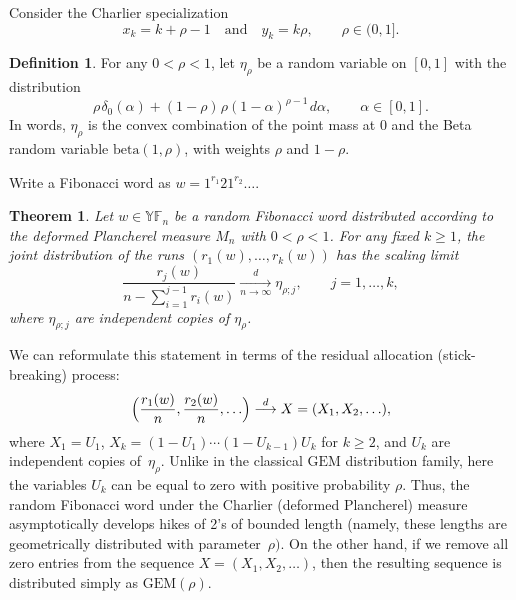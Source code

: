 \documentclass[letterpaper,11pt,oneside,reqno]{article}
\numberwithin{equation}{section}
\newcommand{\ssp}{\hspace{1pt}}
\newtheorem{theorem}[proposition]{Theorem}
\theoremstyle{definition}
\newtheorem{definition}[proposition]{Definition}
\begin{document}
Consider the Charlier specialization
\begin{equation}
	x_k = k + \rho - 1 \quad \text{and} \quad y_k = k \rho ,\qquad  \rho \in (0, 1].
\end{equation}

\begin{definition}
	For any $0<\rho<1$,
	let $\eta_{\rho}$ be a random variable on $[0,1]$ with the distribution
	\begin{equation}
			\rho \ssp\delta_0(\alpha) + (1 - \rho)\ssp \rho (1 - \alpha)^{\rho - 1} \ssp d\alpha,\qquad
			\alpha\in[0,1].
	\end{equation}
	In words, $\eta_\rho$ is
	the convex combination of the point mass at $0$ and the Beta
	random variable $\mathrm{beta}(1, \rho)$, with weights
	$\rho$ and $1 - \rho$.
\end{definition}

Write a Fibonacci word as $w=1^{r_1}21^{r_2}\ldots $.

\begin{theorem}
	Let $w\in \mathbb{YF}_n$ be a random Fibonacci word distributed
	according to the deformed Plancherel measure $M_n$ with $0<\rho<1$.
	For any fixed $k\ge 1$, the joint distribution of the
	runs $(r_1(w), \ldots, r_k(w))$ has the scaling limit
	\begin{equation*}
		\frac{r_j(w)}{n-\sum_{i=1}^{j-1}r_i(w)}\xrightarrow[n\to\infty]{d}\eta_{\rho;j},\qquad j=1,\ldots,k,
	\end{equation*}
	where $\eta_{\rho;j}$ are independent copies of $\eta_\rho$.
\end{theorem}

We can
reformulate
this statement
in terms of the
residual allocation (stick-breaking) process:
\begin{equation*}
	\Bigl( \frac{r_1(w)}{n}, \frac{r_2(w)}{n}, \ldots \Bigr)
	\stackrel{d}{\longrightarrow}
	X=(X_1,X_2,\ldots ),
\end{equation*}
where $X_1=U_1$, $X_k=(1-U_1)\cdots (1-U_{k-1})U_k $ for $k\ge2$, and $U_k$
are independent copies of~$\eta_\rho$.
Unlike in the classical $\mathrm{GEM}$ distribution family, here
the variables $U_k$ can be equal to zero with positive probability $\rho$.
Thus, the random Fibonacci word
under the Charlier (deformed Plancherel) measure asymptotically
develops hikes of 2's of bounded length
(namely, these lengths are geometrically distributed with parameter~$\rho)$.
On the other hand, if we remove all
zero entries from the sequence
$X=(X_1,X_2,\ldots )$, then the resulting sequence is
distributed simply as $\mathrm{GEM}(\rho)$.
\end{document}
